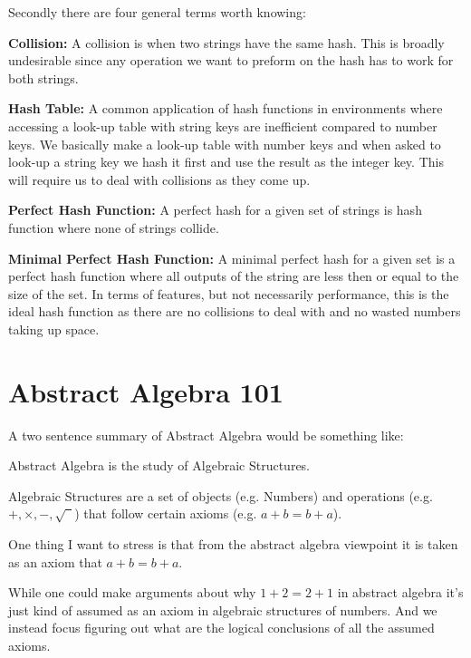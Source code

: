 Secondly there are four general terms worth knowing:

{\textbf{Collision:}} 
A collision is when two strings have the same hash.
This is broadly undesirable since any operation we want to preform on the hash has to work for both strings.

{\textbf{Hash Table:}}
A common application of hash functions in environments where accessing a look-up table with string keys are inefficient compared to number keys.
We basically make a look-up table with number keys and when asked to look-up a string key we hash it first and use the result as the integer key.
This will require us to deal with collisions as they come up.

{\textbf{Perfect Hash Function:}}
A perfect hash for a given set of strings is hash function where none of strings collide.

{\textbf{Minimal Perfect Hash Function:}}
A minimal perfect hash for a given set is a perfect hash function where all outputs of the string are less then or equal to the size of the set.
In terms of features,
but not necessarily performance,
this is the ideal hash function as there are no collisions to deal with and no wasted numbers taking up space.

\section{Abstract Algebra 101}
A two sentence summary of Abstract Algebra would be something like:

\begin{displayquote}
Abstract Algebra is the study of Algebraic Structures.

Algebraic Structures are a set of objects (e.g. Numbers) and operations (e.g. $+,\times,-,\sqrt{\phantom{1}}$) that follow certain axioms (e.g. $a+b = b+a$).
\end{displayquote}

One thing I want to stress is that from the abstract algebra viewpoint it is taken as an axiom
that $a+b = b+a$.

While one could make arguments about why $1+2 = 2+1$ in abstract algebra it's just kind of assumed as an axiom in algebraic structures of numbers.
And we instead focus figuring out what are the logical conclusions of all the assumed axioms.
\\

